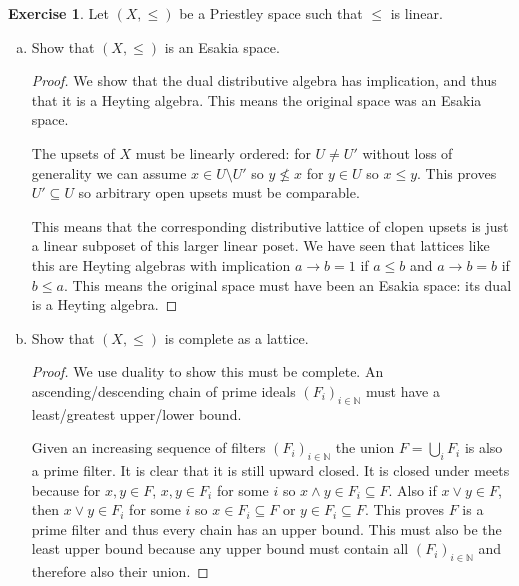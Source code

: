 \documentclass{article}
\newcommand{\N}{\mathbb{N}}
\theoremstyle{definition}
\newtheorem{question}{Exercise}
\begin{document}
\begin{question}
    Let \((X,\leq)\) be a Priestley space such that \(\leq\) is linear.

    \begin{enumerate}[(a)]
        \item Show that \((X,\leq)\) is an Esakia space.

              \begin{proof}
                  We show that the dual distributive algebra has implication,
                  and thus that it is a Heyting algebra. This means the original
                  space was an Esakia space.

                  The upsets of \(X\) must be linearly ordered: for \(U\neq U'\)
                  without loss of generality we can assume \(x\in U\setminus
                  U'\) so \(y\nleq x\) for \(y\in U\) so \(x\leq y\). This
                  proves \(U'\subseteq U\) so arbitrary open upsets must be
                  comparable.

                  This means that the corresponding distributive lattice of
                  clopen upsets is just a linear subposet of this larger linear
                  poset. We have seen that lattices like this are Heyting
                  algebras with implication \(a\to b =1\) if \(a\leq b\) and
                  \(a\to b=b\) if \(b\leq a\). This means the original space
                  must have been an Esakia space: its dual is a Heyting algebra.
              \end{proof}

        \item Show that \((X,\leq)\) is complete as a lattice.

              \begin{proof}
                  We use duality to show this must be complete. An
                  ascending/descending chain of prime ideals
                  \((F_{i})_{i\in\N}\) must have a least/greatest upper/lower
                  bound.

                  Given an increasing sequence of filters \((F_{i})_{i\in\N}\)
                  the union \(F=\bigcup_{i}F_{i}\) is also a prime filter. It is
                  clear that it is still upward closed. It is closed under meets
                  because for \(x,y\in F\), \(x,y\in F_{i}\) for some \(i\) so
                  \(x\wedge y\in F_{i}\subseteq F\). Also if \(x\vee y\in F\),
                  then \(x\vee y\in F_{i}\) for some \(i\) so \(x\in
                  F_{i}\subseteq F\) or \(y\in F_{i}\subseteq F\). This proves
                  \(F\) is a prime filter and thus every chain has an upper
                  bound. This must also be the least upper bound because any
                  upper bound must contain all \((F_{i})_{i\in\N}\) and
                  therefore also their union.


\end{proof}
\end{enumerate}
\end{question}
\end{document}
